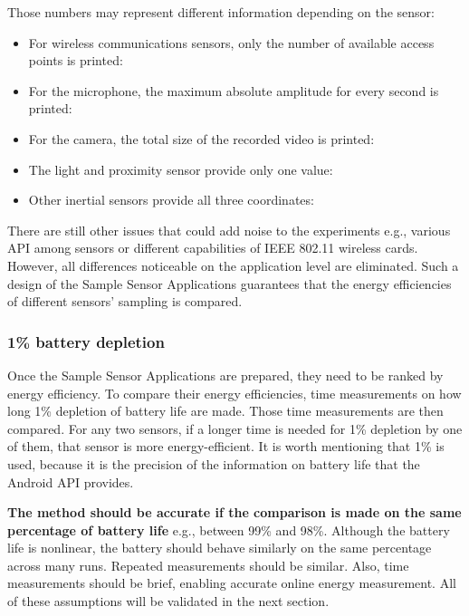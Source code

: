 Those numbers may represent different information depending on the sensor:
\begin{itemize}
	\item For wireless communications sensors, only the number of available access points is printed: 
	\item For the microphone, the maximum absolute amplitude for every second is printed:
	\item For the camera, the total size of the recorded video is printed:
	\item The light and proximity sensor provide only one value:
	\item Other inertial sensors provide all three coordinates:
\end{itemize}

There are still other issues that could add noise to the experiments e.g., various API among sensors or different capabilities of IEEE 802.11 wireless cards. However, all differences noticeable on the application level are eliminated. Such a design of the Sample Sensor Applications guarantees that the energy efficiencies of different sensors' sampling is compared. 
				
\subsubsection{1\% battery depletion}	
\label{s:design:measurements:method}
\hspace{10pt} Once the Sample Sensor Applications are prepared, they need to be ranked by energy efficiency. To compare their energy efficiencies, time measurements on how long 1\% depletion of battery life are made. Those time measurements are then compared. For any two sensors, if a longer time is needed for 1\% depletion by one of them, that sensor is more energy-efficient. It is worth mentioning that 1\% is used, because it is the precision of the information on battery life that the Android API provides.

\textbf{The method should be accurate if the comparison is made on the same percentage of battery life} e.g., between 99\% and 98\%. Although the battery life is nonlinear, the battery should behave similarly on the same percentage across many runs. Repeated measurements should be similar. Also, time measurements should be brief, enabling accurate online energy measurement. All of these assumptions will be validated in the next section.

